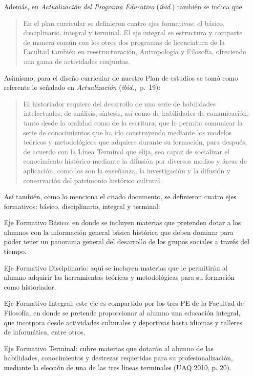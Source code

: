 Además, en {\itshape Actualización del  Programa  Educativo\/} (\textit{ibid.}) 
también se indica que

\begin{quotation}
En el plan curricular se definieron cuatro ejes formativos: el básico, disciplinario, integral y terminal. El eje integral se estructura y comparte de manera común con los otros dos programas de licenciatura de la Facultad también en reestructuración, Antropología y Filosofía, ofreciendo una gama de actividades conjuntas.
\end{quotation}

Asimismo, para el diseño curricular de nuestro Plan de estudios se tomó como referente lo señalado en {\itshape{} Actualización\/} (\textit{ibid.},~p.~19):

\begin{quotation}
El historiador requiere del desarrollo de una serie de habilidades intelectuales, de análisis, síntesis, así como de
habilidades de comunicación, tanto desde la oralidad como de la escritura, que le permita comunicar la serie de
conocimientos que ha ido construyendo mediante los modelos teóricos y metodológicos que adquiere durante su formación,
para después, de acuerdo con la Línea Terminal que elija, sea capaz de socializar el conocimiento histórico mediante la
difusión por diversos medios y áreas de aplicación, como los son la enseñanza, la investigación y la difusión y
conservación del patrimonio histórico cultural.
\end{quotation}
\enlargethispage{1\baselineskip}

Así también, como lo menciona el citado documento, se definieron cuatro ejes 
formativos: básico, disciplinario, integral y terminal:

\begin{Obs}	
\item[Eje Formativo Básico:] en donde se incluyen materias que pretenden dotar a los alumnos con la información general básica histórica que deben dominar para poder tener un panorama general del desarrollo de los grupos sociales a través del
tiempo.
\newpage
\item[Eje Formativo Disciplinario:] aquí se incluyen materias que le permitirán al alumno adquirir las herramientas teóricas y metodológicas para su formación como historiador.
\item[Eje Formativo Integral:] este eje es compartido por los tres PE de la Facultad de Filosofía, en donde se pretende proporcionar al alumno una educación integral, que 
incorpora desde actividades culturales y deportivas hasta idiomas y talleres
de informática, entre otros.
\item[Eje Formativo Terminal:] cubre materias que dotarán al alumno de las habilidades, conocimientos y destrezas requeridas para su profesionalización, mediante la elección de una de las tres líneas terminales (UAQ 2010, p. 20). 
\end{Obs}	

